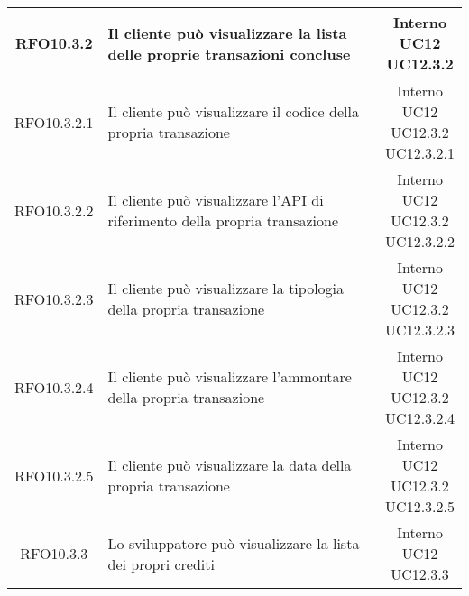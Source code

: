 \begin{longtable}{|c|p{8cm}|c|}
\hypertarget{RFO10.3.2}{RFO10.3.2} & Il cliente può visualizzare la lista delle proprie transazioni concluse & \makecell*{Interno\\UC12\\UC12.3.2} \\
\hline

\hypertarget{RFO10.3.2.1}{RFO10.3.2.1} & Il cliente può visualizzare il codice della propria transazione & \makecell*{Interno\\UC12\\UC12.3.2\\UC12.3.2.1} \\
\hline
\hypertarget{RFO10.3.2.2}{RFO10.3.2.2} & Il cliente può visualizzare l'API di riferimento della propria transazione & \makecell*{Interno\\UC12\\UC12.3.2\\UC12.3.2.2} \\
\hline
\hypertarget{RFO10.3.2.3}{RFO10.3.2.3} & Il cliente può visualizzare la tipologia della propria transazione & \makecell*{Interno\\UC12\\UC12.3.2\\UC12.3.2.3} \\
\hline
\hypertarget{RFO10.3.2.4}{RFO10.3.2.4} & Il cliente può visualizzare l'ammontare della propria transazione & \makecell*{Interno\\UC12\\UC12.3.2\\UC12.3.2.4} \\
\hline
\hypertarget{RFO10.3.2.5}{RFO10.3.2.5} & Il cliente può visualizzare la data della propria transazione & \makecell*{Interno\\UC12\\UC12.3.2\\UC12.3.2.5} \\
\hline

\hypertarget{RFO10.3.3}{RFO10.3.3} & Lo sviluppatore può visualizzare la lista dei propri crediti & \makecell*{Interno\\UC12\\UC12.3.3} \\
\hline


\end{longtable}
